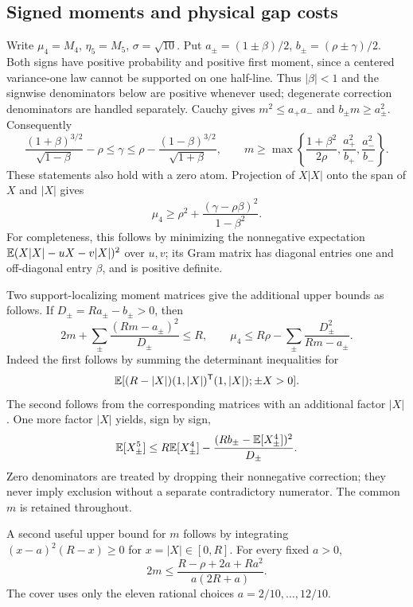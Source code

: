 \subsection{Signed moments and physical gap costs}\label{v9:entry:signed-moments}
Write $\mu_4=M_4$, $\eta_5=M_5$, $\sigma=\sqrt{10}$. Put $a_\pm=(1\pm\beta)/2$, $b_\pm=(\rho\pm\gamma)/2$.
Both signs have positive probability and positive first moment, since a
centered variance-one law cannot be supported on one half-line. Thus
$|\beta|<1$ and the signwise denominators below are positive whenever
used; degenerate correction denominators are handled separately.
Cauchy gives $m^2\le a_+a_-$ and $b_\pm m\ge a_\pm^2$.
Consequently
\[
 \frac{(1+\beta)^{3/2}}{\sqrt{1-\beta}}-\rho
 \le\gamma\le
 \rho-\frac{(1-\beta)^{3/2}}{\sqrt{1+\beta}},\qquad
 m\ge\max\left\{\frac{1+\beta^2}{2\rho},
                  \frac{a_+^2}{b_+},\frac{a_-^2}{b_-}\right\}.
\]
These statements also hold with a zero atom. Projection of $X|X|$ onto
the span of $X$ and $|X|$ gives
\[
 \mu_4\ge\rho^2+\frac{(\gamma-\rho\beta)^2}{1-\beta^2}.
\]
For completeness, this follows by minimizing the nonnegative expectation
$\mathbb E(X|X|-uX-v|X|)^2$ over $u,v$; its Gram matrix has diagonal entries
one and off-diagonal entry $\beta$, and is positive definite.

Two support-localizing moment matrices give the additional upper bounds
as follows. If
$D_\pm=Ra_\pm-b_\pm>0$, then
\[
 2m+\sum_\pm\frac{(Rm-a_\pm)^2}{D_\pm}\le R,
 \qquad
 \mu_4\le R\rho-\sum_\pm\frac{D_\pm^2}{Rm-a_\pm}.
\]
Indeed the first follows by summing the determinant inequalities for
\[\mathbb E[(R-|X|)(1,|X|)^{\mathsf T}(1,|X|);\pm X>0].\]
The second follows from the corresponding matrices with an additional
factor $|X|$. One more factor $|X|$ yields, sign by sign,
\[
 \mathbb E[X_\pm^5]\le R \mathbb E[X_\pm^4]
 -\frac{(Rb_\pm-\mathbb E[X_\pm^4])^2}{D_\pm}.
\]
Zero denominators are treated by dropping their nonnegative correction;
they never imply exclusion without a separate contradictory numerator.
The common $m$ is retained throughout.

A second useful upper bound for $m$ follows by integrating
$(x-a)^2(R-x)\ge0$ for $x=|X|\in[0,R]$. For every fixed $a>0$,
\[
 2m\le\frac{R-\rho+2a+Ra^2}{a(2R+a)}.
\]
The cover uses only the eleven rational choices $a=2/10,\ldots,12/10$.

